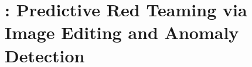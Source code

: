 \section{\redit: Predictive Red Teaming via Image Editing and Anomaly Detection}
\label{sec:approach}






